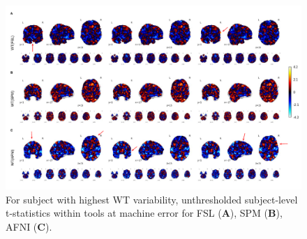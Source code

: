 \documentclass[11pt,onecolumn]{article}
\begin{document}
\begin{figure}[ht]
  \centering
  \includegraphics[width=\textwidth]{figures/5-marked.pdf}
  \caption{For subject with highest WT variability, unthresholded subject-level t-statistics
  within tools at machine error for FSL (\textbf{A}),
  SPM (\textbf{B}), AFNI (\textbf{C}).}
  \label{fig:unthresh-worst-sbj}
\end{figure}
\end{document}
